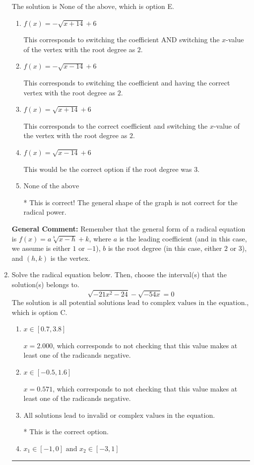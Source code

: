 \documentclass{extbook}[14pt]
\newcommand{\litem}[1]{\item #1

\rule{\textwidth}{0.4pt}}
\begin{document}
\begin{enumerate}
{The solution is \( \text{None of the above} \), which is option E.\begin{enumerate}[label=\Alph*.]
\item \( f(x) = - \sqrt{x + 14} + 6 \)

This corresponds to switching the coefficient AND switching the $x$-value of the vertex with the root degree as $2$.
\item \( f(x) = - \sqrt{x - 14} + 6 \)

This corresponds to switching the coefficient and having the correct vertex with the root degree as $2$.
\item \( f(x) = \sqrt{x + 14} + 6 \)

This corresponds to the correct coefficient and switching the $x$-value of the vertex with the root degree as $2$.
\item \( f(x) = \sqrt{x - 14} + 6 \)

This would be the correct option if the root degree was $3$.
\item \( \text{None of the above} \)

* This is correct! The general shape of the graph is not correct for the radical power.
\end{enumerate}

\textbf{General Comment:} Remember that the general form of a radical equation is $ f(x) = a \sqrt[b]{x - h} + k$, where $a$ is the leading coefficient (and in this case, we assume is either $1$ or $-1$), $b$ is the root degree (in this case, either $2$ or $3$), and $(h, k)$ is the vertex.
}
\litem{
Solve the radical equation below. Then, choose the interval(s) that the solution(s) belongs to.
\[ \sqrt{-21 x^2 - 24} - \sqrt{-54 x} = 0 \]The solution is \( \text{all potential solutions lead to complex values in the equation.} \), which is option C.\begin{enumerate}[label=\Alph*.]
\item \( x \in [0.7,3.8] \)

$x = 2.000$, which corresponds to not checking that this value makes at least one of the radicands negative.
\item \( x \in [-0.5,1.6] \)

$x = 0.571$, which corresponds to not checking that this value makes at least one of the radicands negative.
\item \( \text{All solutions lead to invalid or complex values in the equation.} \)

* This is the correct option.
\item \( x_1 \in [-1, 0] \text{ and } x_2 \in [-3,1] \)


\end{enumerate}}
\end{enumerate}
\end{document}
